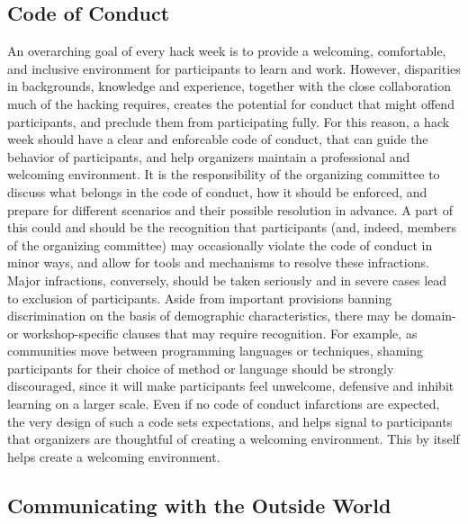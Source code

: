 \documentclass{nature}
\begin{document}
\subsection{Code of Conduct}

An overarching goal of every hack week is to provide a welcoming, comfortable, and inclusive environment for participants to learn and work.
However, disparities in backgrounds, knowledge and experience, together with the close collaboration much of the hacking requires, creates the potential for conduct that might offend participants, and preclude them from participating fully.
For this reason, a hack week should have a clear and enforcable code of conduct, that can guide the behavior of participants, and help organizers maintain a professional and welcoming environment.
It is the responsibility of the organizing committee to discuss what belongs in the code of conduct, how it should be enforced, and prepare for different scenarios and their possible resolution in advance.
A part of this could and should be the recognition that participants (and, indeed, members of the organizing committee) may occasionally violate the code of conduct in minor ways, and allow for tools and mechanisms to resolve these infractions. Major infractions, conversely, should be taken seriously and in severe cases lead to exclusion of participants.
Aside from important provisions banning discrimination on the basis of demographic characteristics, there may be domain- or workshop-specific clauses that may require recognition. For example, as communities move between programming languages or techniques, shaming participants for their choice of method or language should be strongly discouraged, since it will make participants feel unwelcome, defensive and inhibit learning on a larger scale.
Even if no code of conduct infarctions are expected, the very design of such a code sets expectations, and helps signal to participants that organizers are thoughtful of creating a welcoming environment. This by itself helps create a welcoming environment.

\subsection{Communicating with the Outside World}
\end{document}
